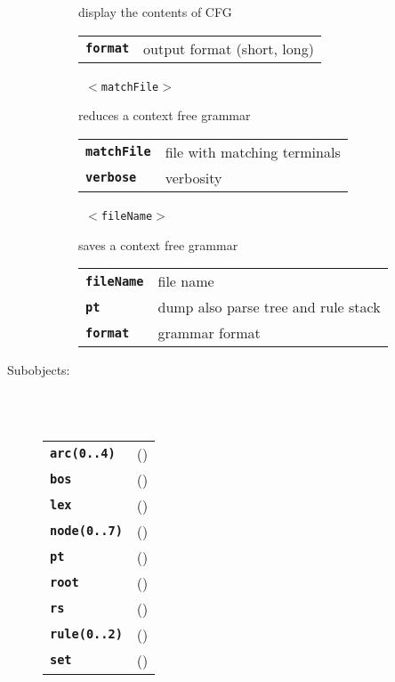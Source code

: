 \begin{description}
\begin{description}
        display the contents of CFG

      \begin{tabular}{ll}
 \texttt{\textbf{format}} &  output format (short, long)  \\
      \end{tabular}
       \texttt{ $<$matchFile$>$ } \

        reduces a context free grammar

      \begin{tabular}{ll}
 \texttt{\textbf{matchFile}} &  file with matching terminals  \\
 \texttt{\textbf{verbose}} &     verbosity  \\
      \end{tabular}
       \texttt{ $<$fileName$>$  } \

        saves a context free grammar

      \begin{tabular}{ll}
 \texttt{\textbf{fileName}} &  file name  \\
 \texttt{\textbf{pt}} &         dump also parse tree and rule stack  \\
 \texttt{\textbf{format}} &     grammar format  \\
      \end{tabular}
    \end{description}

  \item[Subobjects:] \hfill \\
\ 
    \begin{tabular}{ll}
      \texttt{\textbf{arc(0..4)}} & (\Jref{module}{}) \\
      \texttt{\textbf{bos}} & (\Jref{module}{CFGNode}) \\
      \texttt{\textbf{lex}} & (\Jref{module}{CFGLexicon}) \\
      \texttt{\textbf{node(0..7)}} & (\Jref{module}{}) \\
      \texttt{\textbf{pt}} & (\Jref{module}{CFGParseTree}) \\
      \texttt{\textbf{root}} & (\Jref{module}{CFGRule}) \\
      \texttt{\textbf{rs}} & (\Jref{module}{CFGRuleStack}) \\
      \texttt{\textbf{rule(0..2)}} & (\Jref{module}{}) \\
      \texttt{\textbf{set}} & (\Jref{module}{CFGSet}) \\
    \end{tabular}
\vspace{3mm}

\end{description}

